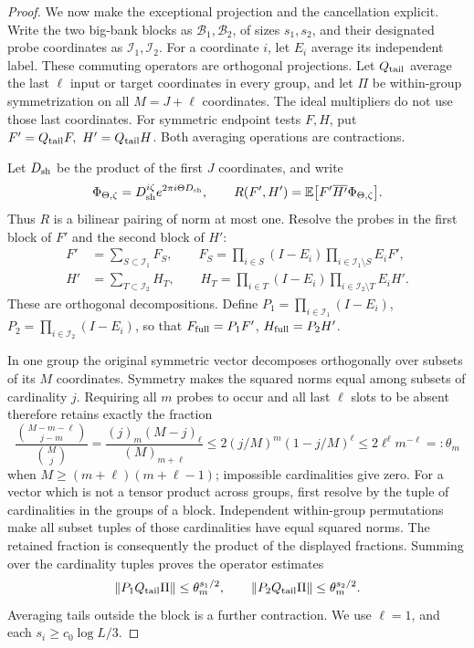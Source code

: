 \begin{proof}
We now make the exceptional projection and the cancellation explicit.
Write the two big-bank blocks as \(\mathcal B_1,\mathcal B_2\), of
sizes \(s_1,s_2\), and their designated probe coordinates as
\(\mathcal I_1,\mathcal I_2\).  For a coordinate \(i\), let \(E_i\)
average its independent label.  These commuting operators are
orthogonal projections.  Let \(Q_{\rm tail}\) average the last
\(\ell\) input or target coordinates in every group, and let
\(\Pi\) be within-group symmetrization on all \(M=J+\ell\) coordinates.
The ideal multipliers do not use those last coordinates.
For symmetric endpoint tests \(F,H\), put
\(F'=Q_{\rm tail}F,\ H'=Q_{\rm tail}H\).
Both averaging operations are contractions.

Let \(D_{\rm sh}\) be the product of the first \(J\) coordinates,
and write
\[
 \Phi_{\Theta,\zeta}
       =D_{\rm sh}^{i\zeta}e^{2\pi i \Theta D_{\rm sh}},\qquad
 R(F',H')=\mathbb E\big[F'\overline{H'}\Phi_{\Theta,\zeta}\big].
\]
Thus \(R\) is a bilinear pairing of norm at most one.
Resolve the probes in the first block of \(F'\) and the second
block of \(H'\):
\[
 \begin{split}
 F'&=\sum_{S\subset\mathcal I_1}F_S,\qquad
 F_S=\prod_{i\in S}(I-E_i)
             \prod_{i\in\mathcal I_1\setminus S}E_iF',\\
 H'&=\sum_{T\subset\mathcal I_2}H_T,\qquad
 H_T=\prod_{i\in T}(I-E_i)
             \prod_{i\in\mathcal I_2\setminus T}E_iH'.
 \end{split}
\]
These are orthogonal decompositions.  Define
\(P_1=\prod_{i\in\mathcal I_1}(I-E_i)\),
\(P_2=\prod_{i\in\mathcal I_2}(I-E_i)\), so that
\(F_{\rm full}=P_1F'\), \(H_{\rm full}=P_2H'\).

In one group the original symmetric vector decomposes orthogonally
over subsets of its \(M\) coordinates.  Symmetry makes the squared
norms equal among subsets of cardinality \(j\).
Requiring all \(m\) probes to occur and all last \(\ell\) slots
to be absent therefore retains exactly the fraction
\[
 \frac{\binom{M-m-\ell}{j-m}}{\binom Mj}
     =\frac{(j)_m(M-j)_\ell}{(M)_{m+\ell}}
     \le 2(j/M)^m(1-j/M)^\ell
     \le2\ell^\ell m^{-\ell}=:\theta_m
\]
when \(M\ge(m+\ell)(m+\ell-1)\); impossible cardinalities give zero.
For a vector which is not a tensor product across groups, first
resolve by the tuple of cardinalities in the groups of a block.
Independent within-group permutations make all subset tuples of
those cardinalities have equal squared norms.  The retained fraction
is consequently the product of the displayed fractions.
Summing over the cardinality tuples proves the operator estimates
\begin{equation}\label{eq:gr-blockprojection}
 \|P_1Q_{\rm tail}\Pi\|\le\theta_m^{s_1/2},\qquad
 \|P_2Q_{\rm tail}\Pi\|\le\theta_m^{s_2/2}.
\end{equation}
Averaging tails outside the block is a further contraction.
We use \(\ell=1\), and each \(s_i\ge c_0\log L/3\).


\end{proof}
